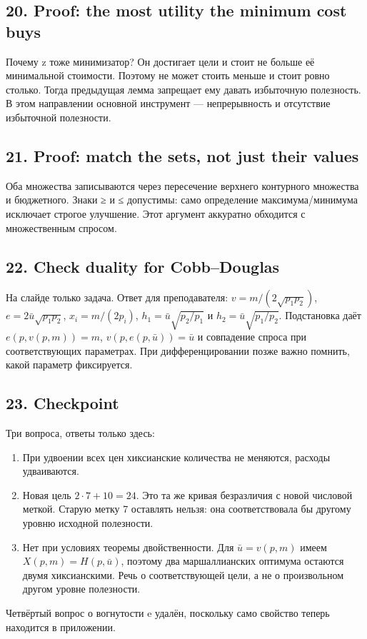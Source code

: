 \documentclass[11pt,a4paper]{article}
\begin{document}
\subsection*{20. Proof: the most utility the minimum cost buys}
Почему z тоже минимизатор? Он достигает цели и стоит не больше её минимальной стоимости. Поэтому не может стоить меньше и стоит ровно столько. Тогда предыдущая лемма запрещает ему давать избыточную полезность. В этом направлении основной инструмент — непрерывность и отсутствие избыточной полезности.

\subsection*{21. Proof: match the sets, not just their values}
Оба множества записываются через пересечение верхнего контурного множества и бюджетного. Знаки ≥ и ≤ допустимы: само определение максимума/минимума исключает строгое улучшение. Этот аргумент аккуратно обходится с множественным спросом.

\subsection*{22. Check duality for Cobb--Douglas}
На слайде только задача. Ответ для преподавателя: $v=m/(2\sqrt{p_1p_2})$, $e=2\bar u\sqrt{p_1p_2}$, $x_i=m/(2p_i)$, $h_1=\bar u\sqrt{p_2/p_1}$ и $h_2=\bar u\sqrt{p_1/p_2}$. Подстановка даёт $e(p,v(p,m))=m$, $v(p,e(p,\bar u))=\bar u$ и совпадение спроса при соответствующих параметрах. При дифференцировании позже важно помнить, какой параметр фиксируется.

\subsection*{23. Checkpoint}
Три вопроса, ответы только здесь:
\begin{enumerate}
\item При удвоении всех цен хиксианские количества не меняются, расходы удваиваются.
\item Новая цель $2\cdot7+10=24$. Это та же кривая безразличия с новой числовой меткой. Старую метку 7 оставлять нельзя: она соответствовала бы другому уровню исходной полезности.
\item Нет при условиях теоремы двойственности. Для $\bar u=v(p,m)$ имеем $X(p,m)=H(p,\bar u)$, поэтому два маршаллианских оптимума остаются двумя хиксианскими. Речь о соответствующей цели, а не о произвольном другом уровне полезности.
\end{enumerate}
Четвёртый вопрос о вогнутости e удалён, поскольку само свойство теперь находится в приложении.
\end{document}
